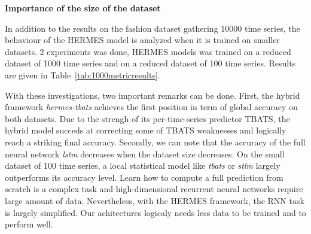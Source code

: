\documentclass{article} %
\newcommand{\predictor}{\mathrm{RNN}_p}
\newcommand{\classifier}{\mathrm{RNN}_c}
\begin{document}


\textbf{Importance of the size of the dataset}

In addition to the results on the fashion dataset gathering 10000 time series, the behaviour of the HERMES model is analyzed when it is trained on smaller datasets. 2 experiments was done, HERMES models was trained on a reduced dataset of 1000 time series and on a reduced dataset of 100 time series. Results are given in Table~\ref{tab:1000metricresults}.

With these investigations, two important remarks can be done. First, the hybrid framework \textit{hermes-tbats} achieves the first position in term of global accuracy on both datasets. Due to the strengh of its per-time-series predictor TBATS, the hybrid model succeds at correcting some of TBATS weaknesses and logically reach a striking final accuracy. Secondly, we can note that the accuracy of the full neural network \textit{lstm} decreases when the dataset size decreases. On the small dataset of 100 time series, a local statistical model like \textit{tbats} or \textit{stlm} largely outperforms its accuracy level. Learn how to compute a full prediction from scratch is a complex task and high-dimensional recurrent neural networks require  large amount of data. Nevertheless, with the HERMES framework, the RNN task is largely simplified. Our achitectures logicaly needs less data to be trained and to perform well.
\end{document}
